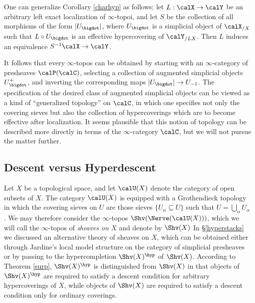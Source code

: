 \begin{remark}
One can generalize Corollary \ref{charhyp} as follows: let $L: \calX \rightarrow \calY$ be an arbitrary left exact localization of $\infty$-topoi, and let $S$ be the collection of all morphisms of the form
$|U_{\bigdot}|$, where $U_{\bigdot}$ is a simplicial object of $\calX_{/X}$ such that
$L \circ U_{\bigdot}$ is an effective hypercovering of $\calY_{/LX}$. 
Then $L$ induces an equivalence $S^{-1} \calX \rightarrow \calY$.

It follows that every $\infty$-topos can be obtained by starting with an $\infty$-category of presheaves $\calP(\calC)$, selecting a collection of augmented simplicial objects
$U^{+}_{\bigdot}$, and inverting the corresponding
maps $|U_{\bigdot}| \rightarrow U_{-1}$. The specification of the desired class of augmented simplicial objects can be viewed as a kind of ``generalized topology'' on $\calC$, in which one specifies not only the covering sieves but also the collection of hypercoverings which are to become effective after localization. It seems plausible that this notion of topology can be described more directly in terms of the $\infty$-category $\calC$, but we will not pursue the matter further.
\end{remark}

\subsection{Descent versus Hyperdescent}\label{versus}

Let $X$ be a topological space, and let $\calU(X)$ denote the category of open subsets of $X$. The category $\calU(X)$ is equipped with a Grothendieck topology in which the covering sieves
on $U$ are those sieves $\{ U_{\alpha} \subseteq U \}$ such that $U = \bigcup_{\alpha} U_{\alpha}$. We may therefore consider the $\infty$-topos $\Shv(\Nerve(\calU(X)))$, which we will 
call the $\infty$-topos of {\it sheaves on $X$} and denote by $\Shv(X)$
In \S \ref{hyperstacks} we discussed an alternative theory of sheaves on $X$, which can be obtained either through Jardine's local model structure on the category of simplicial presheaves or by passing to the hypercompletion $\Shv(X)^{\hyp}$ of $\Shv(X)$. According to Theorem \ref{surp}, $\Shv(X)^{\hyp}$ is distinguished from $\Shv(X)$ in that objects of $\Shv(X)^{\hyp}$ are required to satisfy a descent condition for arbitrary hypercoverings of $X$, while objects of $\Shv(X)$ are required to satisfy a descent condition only for ordinary coverings.

